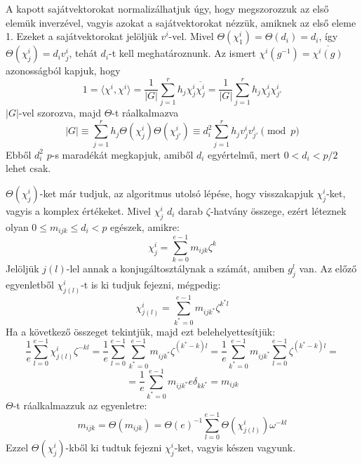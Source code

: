 A kapott sajátvektorokat normalizálhatjuk úgy, hogy megszorozzuk az első elemük inverzével, vagyis azokat a sajátvektorokat nézzük, amiknek az első eleme 1.
Ezeket a sajátvektorokat jelöljük $v^i$-vel. Mivel $\Theta(\chi^i_1)=\Theta(d_i)=d_i$, így $\Theta(\chi^i_j)=d_i v^i_j$, tehát $d_i$-t kell meghatároznunk.
Az ismert $\chi^i(g^{-1})=\overline{\chi^i(g)}$ azonosságból kapjuk, hogy
\begin{equation}
\label{eq:bdssch3}
1 = \langle \chi^i, \chi^i \rangle = \frac{1}{|G|}\sum_{j=1}^r h_j \chi^i_j \overline{\chi^i_j} = \frac{1}{|G|}\sum_{j=1}^r h_j \chi^i_j \chi^i_{j'}
\end{equation}
$|G|$-vel szorozva, majd $\Theta$-t ráalkalmazva
\begin{equation}
\label{eq:bdssch4}
|G| \equiv \sum_{j=1}^r h_j \Theta(\chi^i_j) \Theta(\chi^i_{j'}) \equiv d_i^2 \sum_{j=1}^r h_j v^i_j v^i_{j'} \pmod{p}
\end{equation}
Ebből $d_i^2$ $p$-s maradékát megkapjuk, amiből $d_i$ egyértelmű, mert $0<d_i<p/2$ lehet csak.

$\Theta(\chi^i_j)$-ket már tudjuk, az algoritmus utolsó lépése, hogy visszakapjuk $\chi^i_j$-ket, vagyis a komplex értékeket.
Mivel $\chi^i_j$ $d_i$ darab $\zeta$-hatvány összege, ezért léteznek olyan $0\le m_{ijk}\le d_i < p$ egészek, amikre:
\begin{equation}
\label{eq:bdsmijk1}
\chi^i_j = \sum_{k=0}^{e-1} m_{ijk}\zeta^k
\end{equation}
Jelöljük $j(l)$-lel annak a konjugáltosztálynak a számát, amiben $g_j^l$ van. Az előző egyenletből $\chi^i_{j(l)}$-t is ki tudjuk fejezni, mégpedig:
\begin{equation}
\label{eq:bdsmijk2}
\chi^i_{j(l)} = \sum_{k^*=0}^{e-1} m_{ijk^*}\zeta^{k^*l}
\end{equation}
Ha a következő összeget tekintjük, majd ezt belehelyettesítjük:
\begin{equation*}
\label{eq:bdsmijk3a}
\frac{1}{e}\sum_{l=0}^{e-1} \chi^i_{j(l)} \zeta^{-kl} =
\frac{1}{e}\sum_{l=0}^{e-1} \sum_{k^*=0}^{e-1} m_{ijk^*}\zeta^{(k^*-k)l} =
\frac{1}{e}\sum_{k^*=0}^{e-1} m_{ijk^*} \sum_{l=0}^{e-1} \zeta^{(k^*-k)l} =
\end{equation*}
\begin{equation}
\label{eq:bdsmijk3b}
= \frac{1}{e}\sum_{k^*=0}^{e-1} m_{ijk^*} e \delta_{kk^*} = m_{ijk}
\end{equation}
$\Theta$-t ráalkalmazzuk az egyenletre:
\begin{equation}
\label{eq:bdsmijk4}
m_{ijk} = \Theta(m_{ijk}) = \Theta(e)^{-1} \sum_{l=0}^{e-1} \Theta(\chi^i_{j(l)}) \omega^{-kl}
\end{equation}
Ezzel $\Theta(\chi^i_j)$-kből ki tudtuk fejezni $\chi^i_j$-ket, vagyis készen vagyunk.

